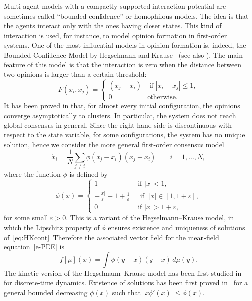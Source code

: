 \documentclass{article}
\theoremstyle{definition}\newtheorem{remark}{Remark}
\newcommand{\eps}{\varepsilon}
\begin{document}
Multi-agent models with a compactly supported interaction potential are sometimes called ``bounded confidence'' or homophilous models. The idea is that the agents interact only with the ones having closer states. 
This kind of interaction is used, for instance, to model opinion formation in first-order systems. 
One of the most influential models in opinion formation is, indeed, the Bounded Confidence Model by Hegselmann and Krause~\cite{HK} (see also \cite{BHT}). The main feature of this model is that the interaction is zero when the distance between two opinions is larger than a certain threshold:
$$
F(x_i,x_j) = 
\begin{cases}
(x_j-x_i) & \mbox{ if } |x_{i}-x_{j}| \leq 1,\\
0& \mbox{otherwise}.
\end{cases}
$$ 
It has been proved in \cite{BHT} that, for almost every initial configuration, the opinions converge asymptotically to clusters. 
In particular, the system does not reach global consensus in general.
Since the right-hand side is discontinuous with respect to the state variable, for some configurations, the system has no unique solution, 
hence we consider the more general first-order consensus model
\begin{equation}
\dot x_{i} = \frac{1}{N} \sum_{j\neq i} \phi(x_{j}-x_{i})(x_j-x_i)  \qquad  i=1,\ldots, N,
\label{eq:HKcont}
\end{equation}
where the function $\phi$ is defined by 
\begin{equation}
\phi(x)=\begin{cases}
1&\mbox{ if } |x|<1,\\
-\frac{|x|}{\eps}+1+\frac{1}{\eps}&\mbox{~~if~~}|x|\in[1,1+\eps],\\
0&\mbox{ if }|x |>1+\eps,
\end{cases}
\end{equation}
for some small $\eps>0$. This is a variant of the Hegselmann--Krause model, in which the Lipschitz property of $\phi$ ensures existence and uniqueness of solutions of~\eqref{eq:HKcont}. 
Therefore the associated vector field for the mean-field equation~\eqref{e-PDE} is
\begin{equation}\label{eq:fHK}
 f[\mu](x) = \int \phi(y-x)(y-x)\, d\mu(y).
\end{equation}
The kinetic version of the Hegselmann--Krause model has been first studied in~\cite{CFT12} for discrete-time dynamics. Existence of solutions has been first proved in~\cite{BCL09} for 
 a general bounded decreasing $\phi(x)$
such that $|x \phi'(x)|\leq \phi(x)$. 
\end{document}
